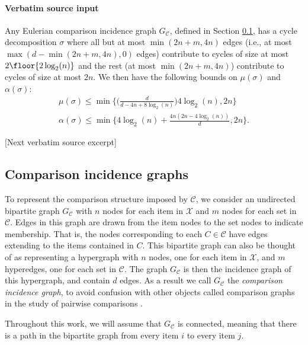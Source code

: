 \documentclass[10pt]{article}
\begin{document}
\paragraph{Verbatim source input}
\begin{ReviewVerbatim}
\begin{lemma}\label{lemma:Gc_cycle_decomposition}
			Any Eulerian comparison incidence graph $G_\mathcal{C}$, defined in Section \ref{subsection:comparison_graph}, has a cycle decomposition $\sigma$ where all but at most $\min(2n+m, 4n)$ edges (i.e., at most $\max(d-\min(2n+m, 4n), 0)$ edges) contribute to cycles of size at most $2\floor{2 \log_2(n)}$ and the rest (at most $\min(2n+m, 4n)$) contribute to cycles of size at most $2n$. We then have the following bounds on $\mu(\sigma)$ and $\alpha(\sigma)$:
			\begin{align*}
			\mu(\sigma) \leq \min \Big\{\Big(\frac{d}{d - 4n + 8\log_2 (n)}\Big)4\log_2 (n), 2n\Big\} \\
			\alpha(\sigma) \leq \min \Big\{4 \log_2(n) + \frac{4n(2n - 4 \log_2(n))}{d}, 2n\Big\}.
			\end{align*}
		\end{lemma}

[Next verbatim source excerpt]

	\subsection{Comparison incidence graphs}\label{subsection:comparison_graph}
	To represent the comparison structure imposed by $\mathcal{C}$, we consider an undirected bipartite graph $G_\mathcal{C}$ with $n$ nodes for each item in $\mathcal{X}$ and $m$ nodes for each set in $\mathcal{C}$. Edges in this graph are drawn from the item nodes to the set nodes to indicate membership. That is, the nodes corresponding to each $C \in \mathcal{C}$ have edges extending to the items contained in $C$. This bipartite graph can also be thought of as representing a hypergraph with $n$ nodes, one for each item in $\mathcal{X}$, and $m$ hyperedges, one for each set in $\mathcal{C}$. The graph $G_\mathcal{C}$ is then the incidence graph of this hypergraph, and contain $d$ edges. As a result we call $G_\mathcal{C}$ the {\it comparison incidence graph}, to avoid confusion with other objects called comparison graphs in the study of pairwise comparisons \cite{ford1957solution,negahban2016rank}.

	Throughout this work, we will assume that $G_\mathcal{C}$ is connected, meaning that there is a path in the bipartite graph from every item $i$ to every item $j$.


\end{ReviewVerbatim}
\end{document}
